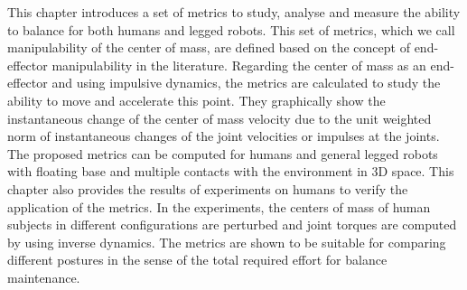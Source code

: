

\newcommand{\Bq}{\mathbf{q}}
\newcommand{\Br}{\mathbf{r}}
\newcommand{\BM}{\mathbf{M}}
\newcommand{\Bg}{\mathbf{g}}
\newcommand{\Bh}{\mathbf{h}}
\newcommand{\BJ}{\mathbf{J}}
\newcommand{\BS}{\mathbf{S}}
\newcommand{\BW}{\mathbf{W}}
\newcommand{\BP}{\mathbf{P}}
\newcommand{\BI}{\mathbf{I}}
\newcommand{\BB}{\mathbf{B}}
\newcommand{\BQ}{\mathbf{Q}}
\newcommand{\BR}{\mathbf{R}}
\newcommand{\Bzero}{\mathbf{0}}
\newcommand{\Bf}{\mathbf{f}}
\newcommand{\Btau}{\boldsymbol{\tau}}
\newcommand{\EQ}{\!\!\!=\!\!\!}
\newcommand{\EQQ}{\!\!\!\!\!\!=\!\!\!\!\!\!}
\newcommand{\Bc}{\mathbf{c}}
\newcommand{\R}{\mathbb{R}}
\newcommand{\Bv}{\mathbf{v}}
\newcommand{\BD}{\mathbf{D}}
\newcommand{\BN}{\mathbf{N}}
\newcommand{\BE}{\mathbf{E}}
\newcommand{\BC}{\mathbf{C}}
\newcommand{\BA}{\mathbf{A}}



This chapter introduces a set of metrics to study, analyse and measure the
ability to balance for both humans and legged robots.  This set of metrics,
which we call manipulability of the center of mass, are defined based on the
concept of end-effector manipulability in the literature.  Regarding the
center of mass as an end-effector and using impulsive dynamics, the metrics
are calculated to study the ability to move and accelerate this point.  They
graphically show the instantaneous change of the center of mass velocity due
to the unit weighted norm of instantaneous changes of the joint velocities or
impulses at the joints.  The proposed metrics can be computed for humans and
general legged robots with floating base and multiple contacts with the
environment in 3D space.  This chapter also provides the results of
experiments on humans to verify the application of the metrics.  In the
experiments, the centers of mass of human subjects in different configurations
are perturbed and joint torques are computed by using inverse dynamics.  The
metrics are shown to be suitable for comparing different postures in the sense
of the total required effort for balance maintenance.

